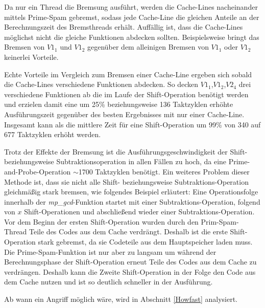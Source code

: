 Da nur ein Thread die Bremsung ausführt, werden die Cache-Lines nacheinander mittels Prime-Spam gebremst, sodass jede Cache-Line die gleichen Anteile an der Berechnungszeit des Bremsthreads erhält.
Auffällig ist, dass die Cache-Lines möglichst nicht die gleiche Funktionen abdecken sollten.
Beispielsweise bringt das Bremsen von $V1_1$ und $V1_2$ gegenüber dem alleinigen Bremsen von $V1_1$ oder $V1_2$ keinerlei Vorteile.

Echte Vorteile im Vergleich zum Bremsen einer Cache-Line ergeben sich sobald die Cache-Lines verschiedene Funktionen abdecken.
So decken $V1_1$,$V1_2$,$V2_4$ drei verschiedene Funktionen ab die im Laufe der Shift-Operation benötigt werden und erzielen damit eine um 25\% beziehungsweise 136 Taktzyklen erhöhte Ausführungszeit gegenüber des besten Ergebnisses mit nur einer Cache-Line.
Insgesamt kann als die mittlere Zeit für eine Shift-Operation um 99\% von 340 auf 677 Taktzyklen erhöht werden.

Trotz der Effekte der Bremsung ist die Ausführungsgeschwindigkeit der Shift- beziehungsweise Subtraktionsoperation in allen Fällen zu hoch, da eine Prime-and-Probe-Operation $\sim$1700 Taktzyklen benötigt.
Ein weiteres Problem dieser Methode ist, dass sie nicht alle Shift- beziehungsweise Subtraktions-Operation gleichmäßig stark bremsen, wie folgendes Beispiel erläutert:
Eine Operationsfolge innerhalb der \textit{mp_gcd}-Funktion startet mit einer Subtraktions-Operation, folgend von $x$ Shift-Operationen und abschließend wieder einer Subtraktions-Operation.
Vor dem Beginn der ersten Shift-Operation wurden durch den Prim-Spam-Thread Teile des Codes aus dem Cache verdrängt.
Deshalb ist die erste Shift-Operation stark gebremst, da sie Codeteile aus dem Hauptspeicher laden muss. 
Die Prime-Spam-Funktion ist nur aber zu langsam um während der Berechnungsphase der Shift-Operation erneut Teile des Codes aus dem Cache zu verdrängen.
Deshalb kann die Zweite Shift-Operation in der Folge den Code aus dem Cache nutzen und ist so deutlich schneller in der Ausführung.

Ab wann ein Angriff möglich wäre, wird in Abschnitt \ref{Howfast} analysiert.






